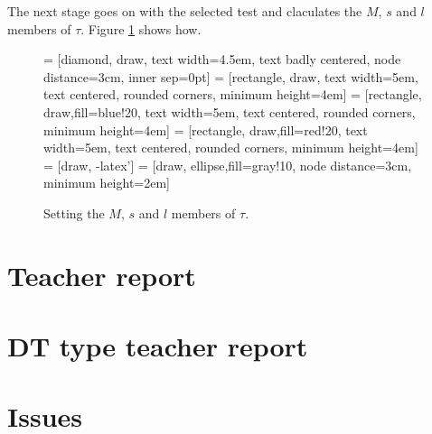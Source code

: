 \documentclass{scrartcl}
\begin{document}
The next stage goes on with the selected test and claculates the $M$, $s$ and $l$ members of $\tau$.  Figure \ref{fig:markings} shows how.
\begin{figure}
\begin{center}
 = [diamond, draw, 
    text width=4.5em, text badly centered, node distance=3cm, inner sep=0pt]
 = [rectangle, draw, 
    text width=5em, text centered, rounded corners, minimum height=4em]
 = [rectangle, draw,fill=blue!20, 
    text width=5em, text centered, rounded corners, minimum height=4em]
 = [rectangle, draw,fill=red!20, 
    text width=5em, text centered, rounded corners, minimum height=4em]
 = [draw, -latex']
 = [draw, ellipse,fill=gray!10, node distance=3cm,
    minimum height=2em]    
\end{center}
\caption{Setting the $M$, $s$ and $l$ members of $\tau$.}
\label{fig:markings}
\end{figure}
\section{Teacher report}
\section{DT type teacher report}
\section{Issues}
\end{document}
